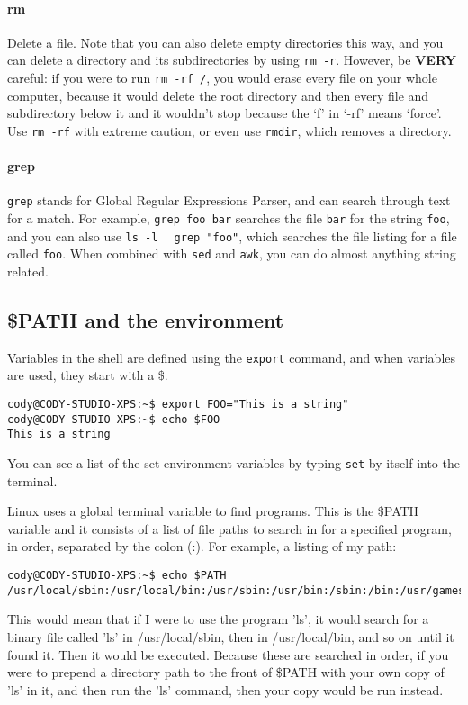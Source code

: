 \documentclass{article}
\begin{document}
\paragraph{rm}
Delete a file. Note that you can also delete empty directories this way, and you can delete a directory and its subdirectories by using \texttt{rm -r}. However, be \textbf{VERY} careful: if you were to run \texttt{rm -rf /}, you would erase every file on your whole computer, because it would delete the root directory and then every file and subdirectory below it and it wouldn't stop because the `f' in `-rf' means `force'. Use \texttt{rm -rf} with extreme caution, or even use \texttt{rmdir}, which removes a directory.
\paragraph{grep}
\texttt{grep} stands for Global Regular Expressions Parser, and can search through text for a match. For example, \texttt{grep foo bar} searches the file \texttt{bar} for the string \texttt{foo}, and you can also use \texttt{ls -l $|$ grep "foo"}, which searches the file listing for a file called \texttt{foo}. When combined with \texttt{sed} and \texttt{awk}, you can do almost anything string related.

\subsection{\$PATH and the environment}
Variables in the shell are defined using the \texttt{export} command, and when variables are used, they start with a \$.
\begin{verbatim}
cody@CODY-STUDIO-XPS:~$ export FOO="This is a string"
cody@CODY-STUDIO-XPS:~$ echo $FOO
This is a string
\end{verbatim} 
You can see a list of the set environment variables by typing \texttt{set} by itself into the terminal.

Linux uses a global terminal variable to find programs. This is the \$PATH variable and it consists of a list of file paths to search in for a specified program, in order, separated by the colon (:). For example, a listing of my path:
\begin{verbatim}
cody@CODY-STUDIO-XPS:~$ echo $PATH
/usr/local/sbin:/usr/local/bin:/usr/sbin:/usr/bin:/sbin:/bin:/usr/games
\end{verbatim}
This would mean that if I were to use the program 'ls', it would search for a binary file called 'ls' in /usr/local/sbin, then in /usr/local/bin, and so on until it found it. Then it would be executed. Because these are searched in order, if you were to prepend a directory path to the front of \$PATH with your own copy of 'ls' in it, and then run the 'ls' command, then your copy would be run instead.
\end{document}
